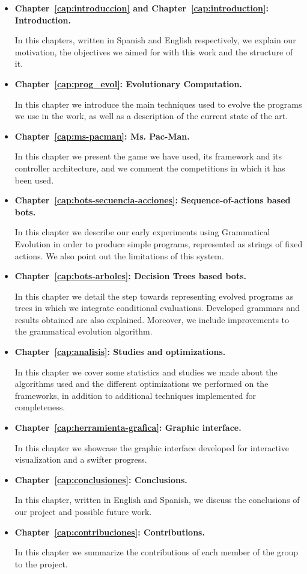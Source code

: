 \begin{itemize}
\item \textbf{Chapter~\ref{cap:introduccion} and Chapter~\ref{cap:introduction}: Introduction.}

In this chapters, written in Spanish and English respectively, we explain our motivation, the objectives we aimed for with this work and the structure of it.

\item \textbf{Chapter~\ref{cap:prog_evol}: Evolutionary Computation.}

In this chapter we introduce the main techniques used to evolve the programs we use in the work, as well as a description of the current state of the art.

\item \textbf{Chapter~\ref{cap:ms-pacman}: Ms. Pac-Man.}

In this chapter we present the game we have used, its framework and its controller architecture, and we comment the competitions in which it has been used.

\item \textbf{Chapter~\ref{cap:bots-secuencia-acciones}: Sequence-of-actions based bots.}

In this chapter we describe our early experiments using Grammatical Evolution in order to produce simple programs, represented as strings of fixed actions. We also point out the limitations of this system.

\item \textbf{Chapter~\ref{cap:bots-arboles}: Decision Trees based bots.}

In this chapter we detail the step towards representing evolved programs as trees in which we integrate conditional evaluations. Developed grammars and results obtained are also explained. Moreover, we include improvements to the grammatical evolution algorithm.

\item \textbf{Chapter~\ref{cap:analisis}: Studies and optimizations.}

In this chapter we cover some statistics and studies we made about the algorithms used and the different optimizations we performed on the frameworks, in addition to additional techniques implemented for completeness.

\item \textbf{Chapter~\ref{cap:herramienta-grafica}: Graphic interface.}

In this chapter we showcase the graphic interface developed for interactive visualization and a swifter progress.

\item \textbf{Chapter~\ref{cap:conclusiones}: Conclusions.}

In this chapter, written in English and Spanish, we discuss the conclusions of our project and possible future work.

\item \textbf{Chapter~\ref{cap:contribuciones}: Contributions.}

In this chapter we summarize the contributions of each member of the group to the project.

\end{itemize}
